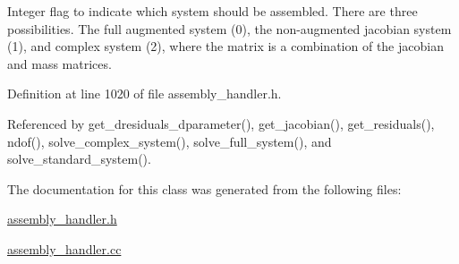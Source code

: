 Integer flag to indicate which system should be assembled. There are three possibilities. The full augmented system (0), the non-\/augmented jacobian system (1), and complex system (2), where the matrix is a combination of the jacobian and mass matrices. 



Definition at line 1020 of file assembly\+\_\+handler.\+h.



Referenced by get\+\_\+dresiduals\+\_\+dparameter(), get\+\_\+jacobian(), get\+\_\+residuals(), ndof(), solve\+\_\+complex\+\_\+system(), solve\+\_\+full\+\_\+system(), and solve\+\_\+standard\+\_\+system().



The documentation for this class was generated from the following files\+:\begin{DoxyCompactItemize}
\item 
\hyperlink{assembly__handler_8h}{assembly\+\_\+handler.\+h}\item 
\hyperlink{assembly__handler_8cc}{assembly\+\_\+handler.\+cc}\end{DoxyCompactItemize}
